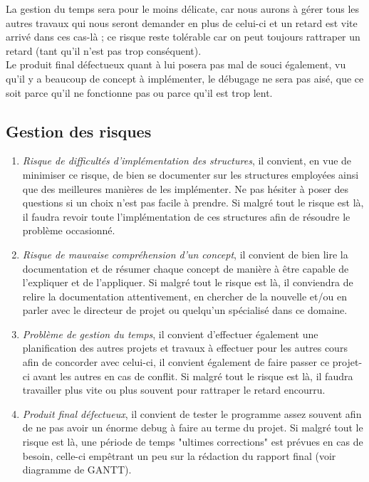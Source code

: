 \documentclass[runningheads]{llncs}
\newcommand{\term}[1]{\textit{\textcolor{maintitle}{#1}}}
\begin{document}
La gestion du temps sera pour le moins délicate, car nous aurons à gérer tous les autres travaux qui nous seront demander en plus 
de celui-ci et un retard est vite arrivé dans ces cas-là ; ce risque reste tolérable car on peut toujours rattraper un retard 
(tant qu'il n'est pas trop conséquent). \\

Le produit final défectueux quant à lui posera pas mal de souci également, vu qu'il y a beaucoup de concept à implémenter, le 
débugage ne sera pas aisé, que ce soit parce qu'il ne fonctionne pas ou parce qu'il est trop lent.

\subsection{Gestion des risques}\label{sec:riskmanagement}

\begin{enumerate}
\item \term{Risque de difficultés d'implémentation des structures}, il convient, en vue de minimiser ce risque, de bien se 
documenter sur les structures employées ainsi que des meilleures manières de les implémenter. Ne pas hésiter à poser des questions 
si un choix n'est pas facile à prendre. Si malgré tout le risque est là, il faudra revoir toute l'implémentation de ces structures
afin de résoudre le problème occasionné.
\item \term{Risque de mauvaise compréhension d'un concept}, il convient de bien lire la documentation et de résumer chaque concept 
de manière à être capable de l'expliquer et de l'appliquer. Si malgré tout le risque est là, il conviendra de relire la 
documentation attentivement, en chercher de la nouvelle et/ou en parler avec le directeur de projet ou quelqu'un spécialisé dans 
ce domaine.
\item \term{Problème de gestion du temps}, il convient d'effectuer également une planification des autres projets et travaux à 
effectuer pour les autres cours afin de concorder avec celui-ci, il convient également de faire passer ce projet-ci avant les 
autres en cas de conflit. Si malgré tout le risque est là, il faudra travailler plus vite ou plus souvent pour rattraper le retard 
encourru.
\item \term{Produit final défectueux}, il convient de tester le programme assez souvent afin de ne pas avoir un énorme debug à 
faire au terme du projet. Si malgré tout le risque est là, une période de temps "ultimes corrections" est prévues en cas de 
besoin, celle-ci empêtrant un peu sur la rédaction du rapport final (voir diagramme de GANTT).
\end{enumerate}
\end{document}
